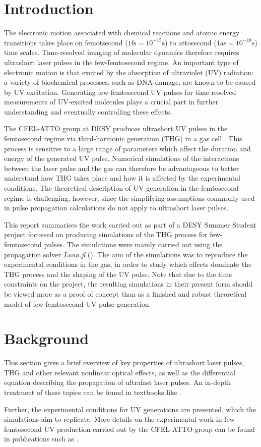 \documentclass[a4paper]{jpconf}
\begin{document}
\section{Introduction}
The electronic motion associated with chemical reactions and atomic energy transitions takes place on femotsecond ($1 \text{fs} = 10^{-15} \text{s}$) to attosecond ($1 \text{as} = 10^{-18} \text{s}$) time scales. Time-resolved imaging of molecular dynamics therefore requires ultrashort laser pulses in the few-femtosecond regime. An important type of electronic motion is that excited by the absorption of ultraviolet (UV) radiation: a variety of biochemical processes, such as DNA damage, are known to be caused by UV excitation. Generating few-femtosecond UV pulses for time-resolved measurements of UV-excited molecules plays a crucial part in further understanding and eventually controlling these effects. \par 
The CFEL-ATTO group at DESY produces ultrashort UV pulses in the femtosecond regime via third-harmonic generation (THG) in a gas cell \cite{galli2019}. This process is sensitive to a large range of parameters which affect the duration and energy of the generated UV pulse. Numerical simulations of the interactions between the laser pulse and the gas can therefore be advantageous to better understand how THG takes place and how it is affected by the experimental conditions. The theoretical description of UV generation in the femtosecond regime is challenging, however, since the simplifying assumptions commonly used in pulse propagation calculations do not apply to ultrashort laser pulses. \par 
This report summarises the work carried out as part of a DESY Summer Student project focussed on producing simulations of the THG process for few-femtosecond pulses. The simulations were mainly carried out using the propagation solver \textit{Luna.jl} (\cite{brahms2023}). The aim of the simulations was to reproduce the experimental conditions in the gas, in order to study which effects dominate the THG process and the shaping of the UV pulse. Note that due to the time constraints on the project, the resulting simulations in their present form should be viewed more as a proof of concept than as a finished and robust theoretical model of few-femtosecond UV pulse generation. 

\section{Background}
This section gives a brief overview of key properties of ultrashort laser pulses,  THG and other relevant nonlinear optical effects, as well as the differential equation describing the propagation of ultrafast laser pulses. An in-depth treatment of these topics can be found in textbooks like \cite{keller2021, new2011}. \par 
Further, the experimental conditions for UV generations are presented, which the simulations aim to replicate. More details on the experimental work in few-femtosecond UV production carried out by the CFEL-ATTO group can be found in publications such as \cite{galli2019}. 
\end{document}
